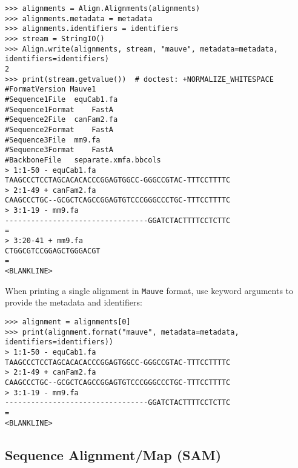 \begin{verbatim}
>>> alignments = Align.Alignments(alignments)
>>> alignments.metadata = metadata
>>> alignments.identifiers = identifiers
>>> stream = StringIO()
>>> Align.write(alignments, stream, "mauve", metadata=metadata, identifiers=identifiers)
2
>>> print(stream.getvalue())  # doctest: +NORMALIZE_WHITESPACE
#FormatVersion Mauve1
#Sequence1File	equCab1.fa
#Sequence1Format	FastA
#Sequence2File	canFam2.fa
#Sequence2Format	FastA
#Sequence3File	mm9.fa
#Sequence3Format	FastA
#BackboneFile	separate.xmfa.bbcols
> 1:1-50 - equCab1.fa
TAAGCCCTCCTAGCACACACCCGGAGTGGCC-GGGCCGTAC-TTTCCTTTTC
> 2:1-49 + canFam2.fa
CAAGCCCTGC--GCGCTCAGCCGGAGTGTCCCGGGCCCTGC-TTTCCTTTTC
> 3:1-19 - mm9.fa
---------------------------------GGATCTACTTTTCCTCTTC
=
> 3:20-41 + mm9.fa
CTGGCGTCCGGAGCTGGGACGT
=
<BLANKLINE>
\end{verbatim}
When printing a single alignment in \verb+Mauve+ format, use keyword arguments to provide the metadata and identifiers:
\begin{verbatim}
>>> alignment = alignments[0]
>>> print(alignment.format("mauve", metadata=metadata, identifiers=identifiers))
> 1:1-50 - equCab1.fa
TAAGCCCTCCTAGCACACACCCGGAGTGGCC-GGGCCGTAC-TTTCCTTTTC
> 2:1-49 + canFam2.fa
CAAGCCCTGC--GCGCTCAGCCGGAGTGTCCCGGGCCCTGC-TTTCCTTTTC
> 3:1-19 - mm9.fa
---------------------------------GGATCTACTTTTCCTCTTC
=
<BLANKLINE>
\end{verbatim}

\subsection{Sequence Alignment/Map (SAM)}
\label{subseq:align_sam}

